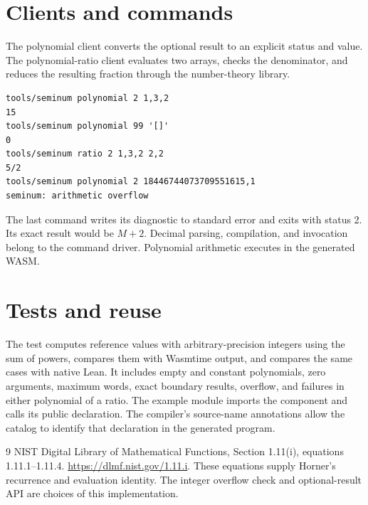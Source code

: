 \section{Clients and commands}
The polynomial client converts the optional result to an explicit status and
value.  The polynomial-ratio client evaluates two arrays, checks the denominator,
and reduces the resulting fraction through the number-theory library.

\begin{lstlisting}
tools/seminum polynomial 2 1,3,2
15
tools/seminum polynomial 99 '[]'
0
tools/seminum ratio 2 1,3,2 2,2
5/2
tools/seminum polynomial 2 18446744073709551615,1
seminum: arithmetic overflow
\end{lstlisting}

The last command writes its diagnostic to standard error and exits with
status 2.  Its exact result would be $M+2$.  Decimal parsing, compilation,
and invocation belong to the command driver.  Polynomial arithmetic executes
in the generated WASM.

\section{Tests and reuse}
The test computes reference values with arbitrary-precision integers using
the sum of powers, compares them with Wasmtime output, and compares the same
cases with native Lean.  It includes empty and constant polynomials, zero
arguments, maximum words, exact boundary results, overflow, and failures
in either polynomial of a ratio.  The example module imports the component
and calls its public declaration.  The compiler's source-name annotations
allow the catalog to identify that declaration in the generated program.

\begin{thebibliography}{9}
 NIST Digital Library of Mathematical Functions,
Section 1.11(i), equations 1.11.1--1.11.4.
\url{https://dlmf.nist.gov/1.11.i}.
These equations supply Horner's recurrence and evaluation identity.
The integer overflow check and optional-result API are choices of this
implementation.
\end{thebibliography}

